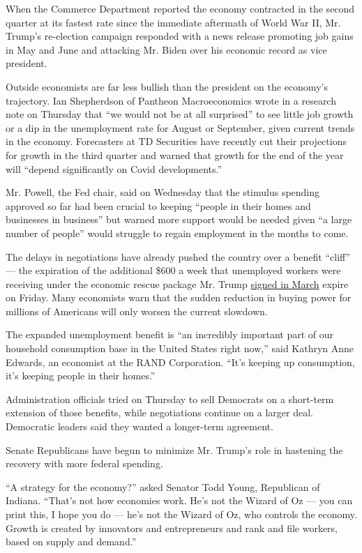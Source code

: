 When the Commerce Department reported the economy contracted in the
second quarter at its fastest rate since the immediate aftermath of
World War II, Mr. Trump's re-election campaign responded with a news
release promoting job gains in May and June and attacking Mr. Biden over
his economic record as vice president.

Outside economists are far less bullish than the president on the
economy's trajectory. Ian Shepherdson of Pantheon Macroeconomics wrote
in a research note on Thursday that ``we would not be at all surprised''
to see little job growth or a dip in the unemployment rate for August or
September, given current trends in the economy. Forecasters at TD
Securities have recently cut their projections for growth in the third
quarter and warned that growth for the end of the year will ``depend
significantly on Covid developments.''

Mr. Powell, the Fed chair, said on Wednesday that the stimulus spending
approved so far had been crucial to keeping ``people in their homes and
businesses in business'' but warned more support would be needed given
``a large number of people'' would struggle to regain employment in the
months to come.

The delays in negotiations have already pushed the country over a
benefit ``cliff'' --- the expiration of the additional \$600 a week that
unemployed workers were receiving under the economic rescue package Mr.
Trump
\href{https://www.nytimes.com/2020/03/25/us/politics/coronavirus-senate-deal.html}{signed
in March} expire on Friday. Many economists warn that the sudden
reduction in buying power for millions of Americans will only worsen the
current slowdown.

The expanded unemployment benefit is ``an incredibly important part of
our household consumption base in the United States right now,'' said
Kathryn Anne Edwards, an economist at the RAND Corporation. ``It's
keeping up consumption, it's keeping people in their homes.''

Administration officials tried on Thursday to sell Democrats on a
short-term extension of those benefits, while negotiations continue on a
larger deal. Democratic leaders said they wanted a longer-term
agreement.

Senate Republicans have begun to minimize Mr. Trump's role in hastening
the recovery with more federal spending.

``A strategy for the economy?'' asked Senator Todd Young, Republican of
Indiana. ``That's not how economies work. He's not the Wizard of Oz ---
you can print this, I hope you do --- he's not the Wizard of Oz, who
controls the economy. Growth is created by innovators and entrepreneurs
and rank and file workers, based on supply and demand.''

